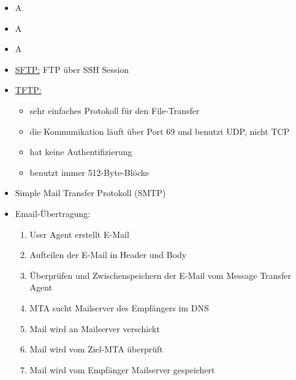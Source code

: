 \begin{itemize}
    \item \todo A
\end{itemize}

\begin{itemize}
    \item \todo A
\end{itemize}

\begin{itemize}
    \item \todo A
\end{itemize}

\begin{itemize}
    \item \underline{SFTP:} FTP über SSH Session
    \item \underline{TFTP:}
    \begin{itemize}
        \item sehr einfaches Protokoll für den File-Transfer
        \item die Kommunikation läuft über Port 69 und benutzt UDP, nicht TCP
        \item hat keine Authentifizierung
        \item benutzt immer 512-Byte-Blöcke
    \end{itemize}
\end{itemize}

\begin{itemize}
    \item Simple Mail Transfer Protokoll (SMTP)
    \item Email-Übertragung:
    \begin{enumerate}
        \item User Agent erstellt E-Mail
        \item Aufteilen der E-Mail in Header und Body
        \item Überprüfen und Zwischenspeichern der E-Mail vom Message Transfer Agent
        \item MTA sucht Mailserver des Empfängers im DNS
        \item Mail wird an Mailserver verschickt
        \item Mail wird vom Ziel-MTA überprüft
        \item Mail wird vom Empfänger Mailserver gespeichert
    \end{enumerate}
\end{itemize}

